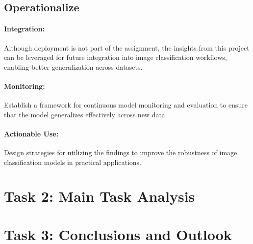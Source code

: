 \documentclass[a4paper,11pt]{article}
\begin{document}
\subsection{Operationalize}
\paragraph{Integration:}  
Although deployment is not part of the assignment, the insights from this project can be leveraged for future integration into image classification workflows, enabling better generalization across datasets.

\paragraph{Monitoring:}  
Establish a framework for continuous model monitoring and evaluation to ensure that the model generalizes effectively across new data.

\paragraph{Actionable Use:}  
Design strategies for utilizing the findings to improve the robustness of image classification models in practical applications.


\section{Task 2: Main Task Analysis}




\section{Task 3: Conclusions and Outlook}




\newpage
\nocite{*}

\end{document}
